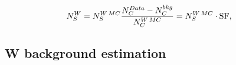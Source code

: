 % 
\begin{align}
  \begin{split}
  \label{eq:ddmethod}
  N_{S}^{W}&=N_{S}^{W\,MC}\frac{N_{C}^{Data}-N_{C}^{bkg}}{N_{C}^{W\,MC}}=N_{S}^{W\,MC}\cdot \rm{SF},
  \end{split}
\end{align}
% 

\subsection{W background estimation}



